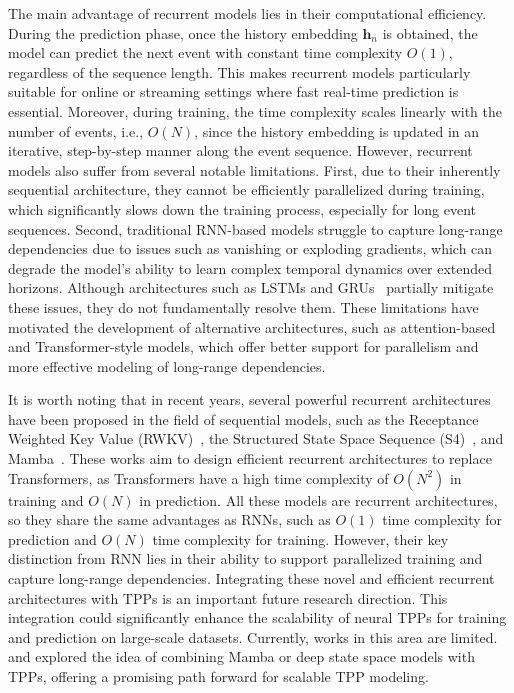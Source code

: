 \documentclass[10pt]{article} %
\begin{document}
The main advantage of recurrent models lies in their computational efficiency. During the prediction phase, once the history embedding $\mathbf{h}_n$ is obtained, the model can predict the next event with constant time complexity $O(1)$, regardless of the sequence length. This makes recurrent models particularly suitable for online or streaming settings where fast real-time prediction is essential. Moreover, during training, the time complexity scales linearly with the number of events, i.e., $O(N)$, since the history embedding is updated in an iterative, step-by-step manner along the event sequence. 
However, recurrent models also suffer from several notable limitations. First, due to their inherently sequential architecture, they cannot be efficiently parallelized during training, which significantly slows down the training process, especially for long event sequences. Second, traditional RNN-based models struggle to capture long-range dependencies due to issues such as vanishing or exploding gradients, which can degrade the model’s ability to learn complex temporal dynamics over extended horizons. Although architectures such as LSTMs and GRUs~\citep{chung2014empirical} partially mitigate these issues, they do not fundamentally resolve them. These limitations have motivated the development of alternative architectures, such as attention-based and Transformer-style models, which offer better support for parallelism and more effective modeling of long-range dependencies. 



It is worth noting that in recent years, several powerful recurrent architectures have been proposed in the field of sequential models, such as the Receptance Weighted Key Value (RWKV)~\citep{peng2023rwkv}, the Structured State Space Sequence (S4)~\citep{guefficiently}, and Mamba~\citep{gu2023mamba}. 
These works aim to design efficient recurrent architectures to replace Transformers, as Transformers have a high time complexity of \(O(N^2)\) in training and \(O(N)\) in prediction. 
All these models are recurrent architectures, so they share the same advantages as RNNs, such as \(O(1)\) time complexity for prediction and \(O(N)\) time complexity for training. However, their key distinction from RNN lies in their ability to support parallelized training and capture long-range dependencies. 
Integrating these novel and efficient recurrent architectures with TPPs is an important future research direction. This integration could significantly enhance the scalability of neural TPPs for training and prediction on large-scale datasets. 
Currently, works in this area are limited. \citet{gao2024mamba} and \citet{chang2024deep} explored the idea of combining Mamba or deep state space models with TPPs, offering a promising path forward for scalable TPP modeling. 
\end{document}
